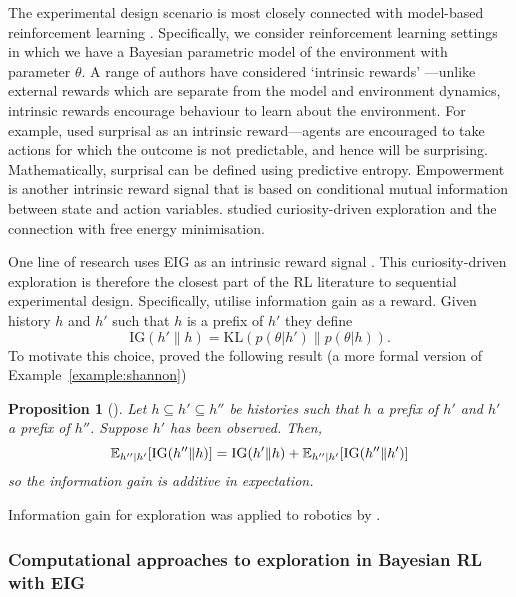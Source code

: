 \documentclass[a4paper, 10pt]{report}
\theoremstyle{plain}
\newtheorem{proposition}[theorem]{Proposition}
\begin{document}
	The experimental design scenario is most closely connected with model-based reinforcement learning \citep{sutton1990integrated}.
	Specifically, we consider reinforcement learning settings in which we have a Bayesian parametric model of the environment with parameter $\theta$.
	A range of authors have considered `intrinsic rewards' \citep{singh2005intrinsically}---unlike external rewards which are separate from the model and environment dynamics, intrinsic rewards encourage behaviour to learn about the environment.
	For example, \citet{itti2006bayesian} used surprisal as an intrinsic reward---agents are encouraged to take actions for which the outcome is not predictable, and hence will be surprising. Mathematically, surprisal can be defined using predictive entropy.
	Empowerment \citep{klyubin2005all,salge2014empowerment,mohamed2015variational} is another intrinsic reward signal that is based on conditional mutual information between state and action variables.
	\citet{sajid2021active} studied curiosity-driven exploration and the connection with free energy minimisation.
	
	One line of research uses EIG as an intrinsic reward signal \citep{storck1995reinforcement}.
	This curiosity-driven exploration \citep{schmidhuber2010formal,sun2011planning} is therefore the closest part of the RL literature to sequential experimental design.
	Specifically, \citet{sun2011planning} utilise information gain as a reward. Given history $h$ and $h'$ such that $h$ is a prefix of $h'$ they define
	\begin{equation}
	\text{IG}(h'\|h) = \text{KL}\left( p(\theta|h') \| p(\theta|h) \right).
	\end{equation}
	To motivate this choice, \citet{sun2011planning} proved the following result (a more formal version of Example~\ref{example:shannon})
	\begin{proposition}[\citet{sun2011planning}]
		Let $h \subseteq h' \subseteq h''$ be histories such that $h$ a prefix of $h'$ and $h'$ a prefix of $h''$.
		Suppose $h'$ has been observed.
		Then,
		\begin{equation}
		\mathbb{E}_{h''|h'}[\textup{IG}(h''\|h)] = \textup{IG}(h'\|h) + \mathbb{E}_{h''|h'}[\textup{IG}(h''\|h')]
		\end{equation}
		so the information gain is additive in expectation.
	\end{proposition}
	Information gain for exploration was applied to robotics by \citet{fung2016autonomous}.
	
	\subsubsection{Computational approaches to exploration in Bayesian RL with EIG}
	
\end{document}
